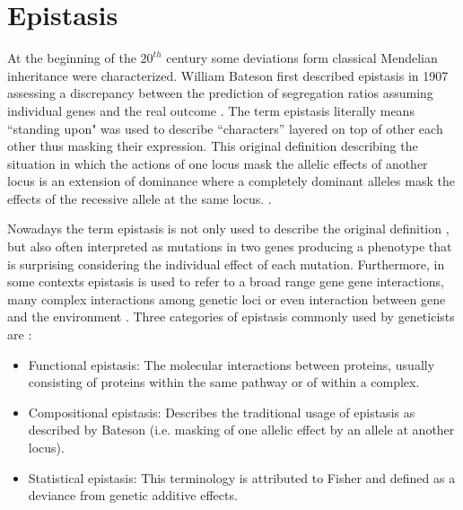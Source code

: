 \section{Epistasis \label{sec:epi}}


At the beginning of the $20^{th}$ century some deviations form classical Mendelian inheritance were characterized.
William Bateson first described epistasis in 1907 \cite{tyler2009shadows} assessing a discrepancy between the prediction of segregation ratios assuming individual genes and the real outcome \cite{phillips2008epistasis}.
The term epistasis literally means ``standing upon" was used to describe ``characters'' layered on top of other each other thus masking their expression.
This original definition describing the situation in which the actions of one locus mask the allelic effects of another locus is an extension of dominance where a completely dominant alleles mask the effects of the recessive allele at the same locus. \cite{carlborg2004epistasis, cordell2002epistasis}.

Nowadays the term epistasis is not only used to describe the original definition \cite{cordell2002epistasis}, but also often interpreted as mutations in two genes producing a phenotype that is surprising considering the individual effect of each mutation.
Furthermore, in some contexts epistasis is used to refer to a broad range gene gene interactions, many complex interactions among genetic loci or even interaction between gene and the environment \cite{phillips2008epistasis}.
Three categories of epistasis commonly used by geneticists are \cite{phillips2008epistasis, zhao2006test}: 
\begin{itemize}
	\item Functional epistasis: The molecular interactions between proteins, usually consisting of proteins within the same pathway or of within a complex.
	\item Compositional epistasis: Describes the traditional usage of epistasis as described by Bateson (i.e. masking of one allelic effect by an allele at another locus).
	\item Statistical epistasis: This terminology is attributed to Fisher and defined as a deviance from genetic additive effects.
\end{itemize}

